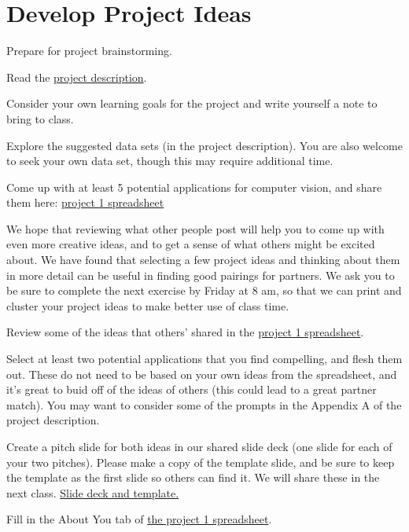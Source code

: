 \documentclass[assignment08_Solutions]{subfiles}
\begin{document}
\section{Develop Project Ideas}

\begin{exercise}
Prepare for project brainstorming.
\bes
\item Read the \href{https://github.com/olincollege/MLfall2021/blob/master/Module\%201/m1_project/m1_project.pdf}{project description}.
\item Consider your own learning goals for the project and write yourself a note to bring to class. 
\item Explore the suggested data sets (in the project description). You are also welcome to seek your own data set, though this may require additional time.
\item Come up with at least 5 potential applications for computer vision, and share them here: \href{https://docs.google.com/spreadsheets/d/1TyzKsfdCvZEzfaYswfJSHiYH2JU73gd0KCIOwQijvFo/edit?usp=sharing}{project 1 spreadsheet} 
\ees 
\end{exercise}
 
\vspace{1em}
We hope that reviewing what other people post will help you to come up with even more creative ideas, and to get a sense of what others might be excited about. We have found that selecting a few project ideas and thinking about them in more detail can be useful in finding good pairings for partners. We ask you to be sure to complete the next exercise by Friday at 8 am, so that we can print and cluster your project ideas to make better use of class time.
\vspace{1em}
\begin{exercise}
\bes
\item Review some of the ideas that others' shared in the \href{https://docs.google.com/spreadsheets/d/1TyzKsfdCvZEzfaYswfJSHiYH2JU73gd0KCIOwQijvFo/edit?usp=sharing}{project 1 spreadsheet}. 
\item Select at least two potential applications that you find compelling, and flesh them out. These do not need to be based on your own ideas from the spreadsheet, and it's great to buid off of the ideas of others (this could lead to a great partner match). You may want to consider some of the prompts in the Appendix A of the project description.
\item Create a pitch slide for both ideas in our shared slide deck (one slide for each of your two pitches). Please make a copy of the template slide, and be sure to keep the template as the first slide so others can find it. We will share these in the next class. \href{https://docs.google.com/presentation/d/1f3u9lJXV9_DzKRhHH41kr8h3xQn4ex6SbpcNwyws9z4/edit?usp=sharing}{Slide deck and template.} 
\item Fill in the About You tab of \href{https://docs.google.com/spreadsheets/d/1TyzKsfdCvZEzfaYswfJSHiYH2JU73gd0KCIOwQijvFo/edit\#gid=798726806}{the project 1 spreadsheet}.
\ees
\end{exercise}
\end{document}
